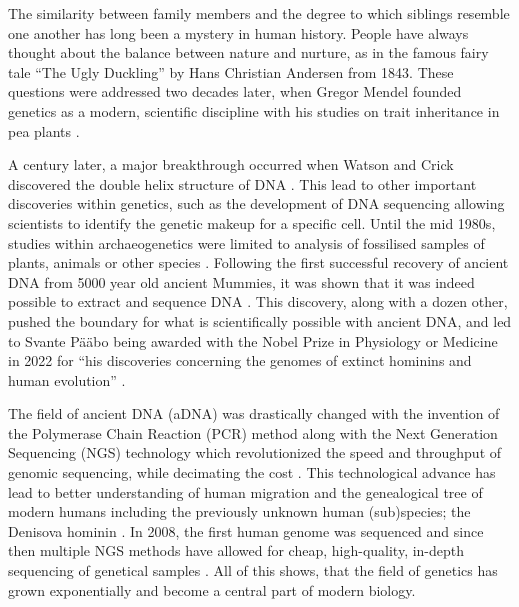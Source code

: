 

The similarity between family members and the degree to which siblings resemble one another has long been a mystery in human history.
People have always thought about the balance between nature and nurture, as in the famous fairy tale ``The Ugly Duckling'' by Hans Christian Andersen from 1843. These questions were addressed two decades later, when Gregor Mendel founded genetics as a modern, scientific discipline with his studies on trait inheritance in pea plants \autocite{mendelgregorVersucheUberPflanzenhybriden1866}.

A century later, a major breakthrough occurred when Watson and Crick discovered the double helix structure of DNA \autocite{watsonMolecularStructureNucleic1953}. This lead to other important discoveries within genetics, such as the development of DNA sequencing allowing scientists to identify the genetic makeup for a specific cell. Until the mid 1980s, studies within archaeogenetics were limited to analysis of fossilised samples of plants, animals or other species \autocite{parducciAncientDNAUnlocking2004}. Following the first successful recovery of ancient DNA from 5000 year old ancient Mummies, it was shown that it was indeed possible to extract and sequence DNA \autocite{paaboMolecularCloningAncient1985,paaboPreservationDNAAncient1985}.
This discovery, along with a dozen other, pushed the boundary for what is scientifically possible with ancient DNA, and led to Svante Pääbo being awarded with the Nobel Prize in Physiology or Medicine in 2022 for ``his discoveries concerning the genomes of extinct hominins and human evolution'' \autocite{thenobelassemblyatkarolinskainstitutetNobelPrizePhysiology2022}.

The field of ancient DNA (aDNA) was drastically changed with the invention of the Polymerase Chain Reaction (PCR) method \autocite{mullisSpecificEnzymaticAmplification1986} along with the Next Generation Sequencing (NGS) technology which revolutionized the speed and throughput of genomic sequencing, while decimating the cost \autocite{slatkoOverviewNextGeneration2018}. This technological advance has lead to better understanding of human migration and the genealogical tree of modern humans including the previously unknown human (sub)species; the Denisova hominin \autocite{krauseCompleteMitochondrialDNA2010}. In 2008, the first human genome was sequenced and since then multiple NGS methods have allowed for cheap, high-quality, in-depth sequencing of genetical samples \autocite{genomicsBriefHistoryNext2021}. All of this shows, that the field of genetics has grown exponentially and become a central part of modern biology.

